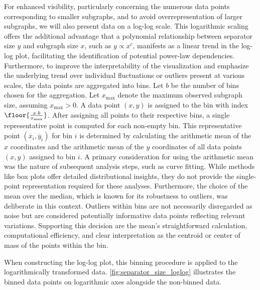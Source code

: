 For enhanced visibility, particularly concerning the numerous data points corresponding to smaller subgraphs, and to avoid overrepresentation of larger subgraphs, we will also present data on a log-log scale.
This logarithmic scaling offers the additional advantage that a polynomial relationship between separator size \( y \) and subgraph size \( x \), such as \( y \propto x^c \), manifests as a linear trend in the log-log plot, facilitating the identification of potential power-law dependencies.
Furthermore, to improve the interpretability of the visualization and emphasize the underlying trend over individual fluctuations or outliers present at various scales, the data points are aggregated into bins.
Let \( b \) be the number of bins chosen for the aggregation.
Let \( x_{\max} \) denote the maximum observed subgraph size, assuming \( x_{\max} > 0 \).
A data point \( (x, y) \) is assigned to the bin with index \( \floor{\frac{x \cdot b}{x_{\max}}} \).
After assigning all points to their respective bins, a single representative point is computed for each non-empty bin.
This representative point \( (\overline{x}_i, \overline{y}_i) \) for bin \( i \) is determined by calculating the arithmetic mean of the \( x \) coordinates and the arithmetic mean of the \( y \) coordinates of all data points \( (x, y) \) assigned to bin \( i \).
A primary consideration for using the arithmetic mean was the nature of subsequent analysis steps, such as curve fitting.
While methods like box plots offer detailed distributional insights, they do not provide the single-point representation required for these analyses.
Furthermore, the choice of the mean over the median, which is known for its robustness to outliers, was deliberate in this context.
Outliers within bins are not necessarily disregarded as noise but are considered potentially informative data points reflecting relevant variations.
Supporting this decision are the mean's straightforward calculation, computational efficiency, and clear interpretation as the centroid or center of mass of the points within the bin.

When constructing the log-log plot, this binning procedure is applied to the logarithmically transformed data.
\cref{fig:separator_size_loglog} illustrates the binned data points on logarithmic axes alongside the non-binned data.

